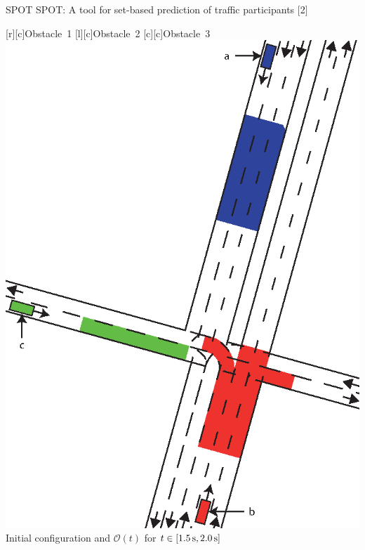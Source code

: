\begin{frame}{SPOT}
SPOT: A tool for set-based prediction of traffic participants $[$2$]$%
\vspace{1em}

\begin{center}
	{\footnotesize
	[c]{Obstacle~1}	
	[c]{Obstacle~2}
	[c]{Obstacle~3}
	\includegraphics[height=0.5\textheight]{./figures/Scenario_Intersection_Occ_1,5-2,0s_final.eps}
	} \\
	\vspace{1em}
	Initial configuration and $\mathcal{O}(t)$ for $t \in [\unit[1.5]{s}, \unit[2.0]{s}]$
\end{center}

\end{frame}

